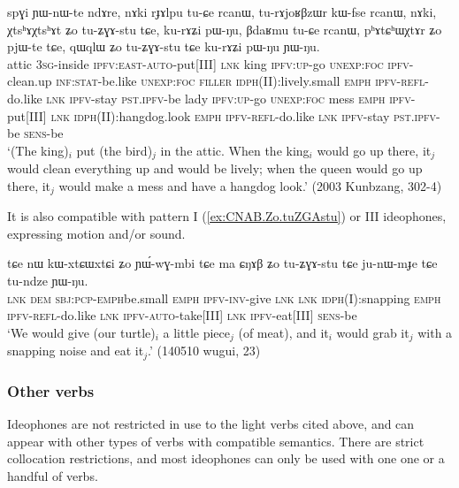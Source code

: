  
\begin{exe}
\ex \label{ex:XtshAXtshAt.Zo.tuZGAstu}
\gll spɣi ɲɯ-nɯ-te ndɤre, nɤki rɟɤlpu tu-ɕe rcanɯ, tu-rɤjoʁβzɯr kɯ-fse rcanɯ, nɤki, χtsʰɤχtsʰɤt ʑo tu-ʑɣɤ-stu tɕe, ku-rɤʑi pɯ-ŋu, βdaʁmu tu-ɕe rcanɯ, pʰɤtɕʰɯχtɤr ʑo pjɯ-te tɕe, qɯqlɯ ʑo tu-ʑɣɤ-stu tɕe ku-rɤʑi pɯ-ŋu ɲɯ-ŋu. 	\\
attic \textsc{3sg}-inside \textsc{ipfv}:\textsc{east}-\textsc{auto}-put[III] \textsc{lnk} king  \textsc{ipfv}:\textsc{up}-go \textsc{unexp}:\textsc{foc} \textsc{ipfv}-clean.up \textsc{inf}:\textsc{stat}-be.like  \textsc{unexp}:\textsc{foc} \textsc{filler}  \textsc{idph}(II):lively.small \textsc{emph} \textsc{ipfv}-\textsc{refl}-do.like \textsc{lnk} \textsc{ipfv}-stay \textsc{pst}.\textsc{ipfv}-be  lady  \textsc{ipfv}:\textsc{up}-go  \textsc{unexp}:\textsc{foc} mess \textsc{emph} \textsc{ipfv}-put[III] \textsc{lnk} \textsc{idph}(II):hangdog.look \textsc{emph} \textsc{ipfv}-\textsc{refl}-do.like \textsc{lnk} \textsc{ipfv}-stay \textsc{pst}.\textsc{ipfv}-be \textsc{sens}-be \\
\glt `(The king)$_i$ put (the bird)$_j$ in the attic. When the king$_i$  would go up there, it$_j$ would clean everything up and would be lively; when the queen would go up there, it$_j$ would make a mess and have a hangdog look.' (2003 Kunbzang, 302-4)
\end{exe}

It is also compatible with pattern I (\ref{ex:CNAB.Zo.tuZGAstu}) or III ideophones, expressing motion and/or sound.

\begin{exe}
\ex \label{ex:CNAB.Zo.tuZGAstu}
\gll tɕe nɯ kɯ-xtɕɯ\redp{}xtɕi ʑo ɲɯ́-wɣ-mbi tɕe ma ɕŋɤβ ʑo tu-ʑɣɤ-stu tɕe ju-nɯ-mɟe tɕe tu-ndze ɲɯ-ŋu. \\
\textsc{lnk} \textsc{dem} \textsc{sbj}:\textsc{pcp}-\textsc{emph}\redp{}be.small \textsc{emph} \textsc{ipfv}-\textsc{inv}-give \textsc{lnk} \textsc{lnk} \textsc{idph}(I):snapping \textsc{emph} \textsc{ipfv}-\textsc{refl}-do.like \textsc{lnk} \textsc{ipfv}-\textsc{auto}-take[III] \textsc{lnk} \textsc{ipfv}-eat[III] \textsc{sens}-be \\
\glt `We would give (our turtle)$_i$ a little piece$_j$ (of meat), and it$_i$ would grab it$_j$ with a snapping noise and eat it$_j$.' (140510 wugui, 23)
\end{exe}

\subsubsection{Other verbs} \label{sec:ideophone.plus.lexical.verb}
Ideophones are not restricted in use to the light verbs cited above, and can appear with other types of verbs with compatible semantics. There are strict collocation restrictions, and most ideophones can only be used with one one or a handful of verbs. 


